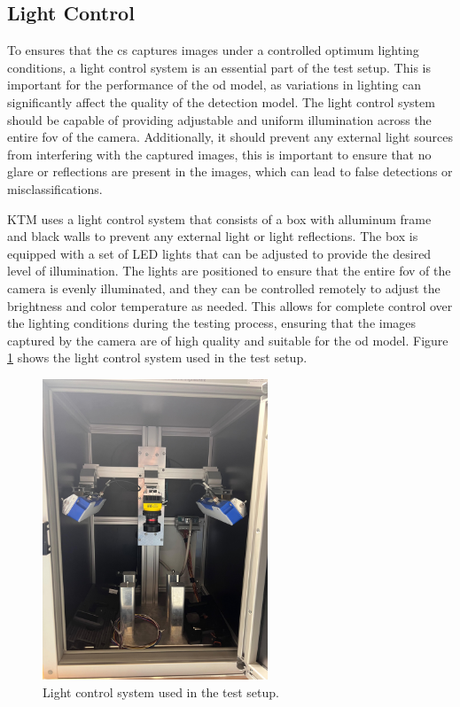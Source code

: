 \subsection{Light Control}
To ensures that the \gls{cs} captures images under a controlled optimum lighting conditions, a light control system is an essential part of the test setup. This is important for the performance of the \gls{od} model, as variations in lighting can significantly affect the quality of the detection model. The light control system should be capable of providing adjustable and uniform illumination across the entire \gls{fov} of the camera. Additionally, it should prevent any external light sources from interfering with the captured images, this is important to ensure that no glare or reflections are present in the images, which can lead to false detections or misclassifications.

KTM uses a light control system that consists of a box with alluminum frame and black walls to prevent any external light or light reflections. The box is equipped with a set of LED lights that can be adjusted to provide the desired level of illumination. The lights are positioned to ensure that the entire \gls{fov} of the camera is evenly illuminated, and they can be controlled remotely to adjust the brightness and color temperature as needed. This allows for complete control over the lighting conditions during the testing process, ensuring that the images captured by the camera are of high quality and suitable for the \gls{od} model. Figure \ref{LightControl} shows the light control system used in the test setup.

\begin{figure}[!htb]
    \centering
    \includegraphics[width=0.6\textwidth]{Figures/Light_Control_Box.jpg}
    \caption{Light control system used in the test setup.}
    \label{LightControl}
\end{figure}

